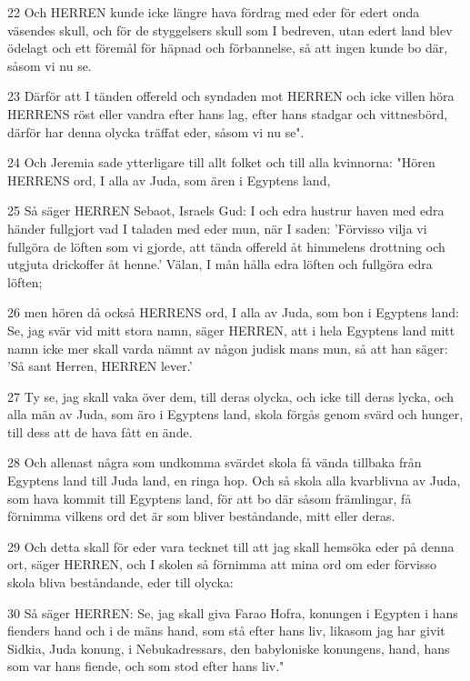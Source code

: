 \par 22 Och HERREN kunde icke längre hava fördrag med eder för edert onda väsendes skull, och för de styggelsers skull som I bedreven, utan edert land blev ödelagt och ett föremål för häpnad och förbannelse, så att ingen kunde bo där, såsom vi nu se.
\par 23 Därför att I tänden offereld och syndaden mot HERREN och icke villen höra HERRENS röst eller vandra efter hans lag, efter hans stadgar och vittnesbörd, därför har denna olycka träffat eder, såsom vi nu se".
\par 24 Och Jeremia sade ytterligare till allt folket och till alla kvinnorna: "Hören HERRENS ord, I alla av Juda, som ären i Egyptens land,
\par 25 Så säger HERREN Sebaot, Israels Gud: I och edra hustrur haven med edra händer fullgjort vad I taladen med eder mun, när I saden: 'Förvisso vilja vi fullgöra de löften som vi gjorde, att tända offereld åt himmelens drottning och utgjuta drickoffer åt henne.' Välan, I mån hålla edra löften och fullgöra edra löften;
\par 26 men hören då också HERRENS ord, I alla av Juda, som bon i Egyptens land: Se, jag svär vid mitt stora namn, säger HERREN, att i hela Egyptens land mitt namn icke mer skall varda nämnt av någon judisk mans mun, så att han säger: 'Så sant Herren, HERREN lever.'
\par 27 Ty se, jag skall vaka över dem, till deras olycka, och icke till deras lycka, och alla män av Juda, som äro i Egyptens land, skola förgås genom svärd och hunger, till dess att de hava fått en ände.
\par 28 Och allenast några som undkomma svärdet skola få vända tillbaka från Egyptens land till Juda land, en ringa hop. Och så skola alla kvarblivna av Juda, som hava kommit till Egyptens land, för att bo där såsom främlingar, få förnimma vilkens ord det är som bliver beståndande, mitt eller deras.
\par 29 Och detta skall för eder vara tecknet till att jag skall hemsöka eder på denna ort, säger HERREN, och I skolen så förnimma att mina ord om eder förvisso skola bliva beståndande, eder till olycka:
\par 30 Så säger HERREN: Se, jag skall giva Farao Hofra, konungen i Egypten i hans fienders hand och i de mäns hand, som stå efter hans liv, likasom jag har givit Sidkia, Juda konung, i Nebukadressars, den babyloniske konungens, hand, hans som var hans fiende, och som stod efter hans liv."

